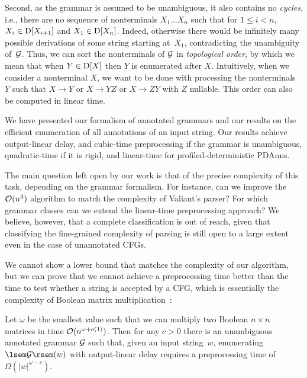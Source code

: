 Second, as the grammar is assumed to be unambiguous, it also contains
no \emph{cycles}, %
i.e., there are no sequence of nonterminals
$X_1 \dots X_n$ such that for $1\leq i < n$, $X_i\in \mathrm{D}[X_{i+1}]$ and
$X_1\in \mathrm{D}[X_n]$. Indeed, otherwise 
%
there would be infinitely many possible derivations of some string
starting at~$X_1$, contradicting the unambiguity of~$\mathcal{G}$.  Thus, we can sort the nonterminals of $\mathcal{G}$
in \emph{topological order}, by which we mean that when $Y\in \mathrm{D}[X]$
then $Y$ is enumerated after $X$. Intuitively, when we consider a nonterminal
$X$, we want to be done with processing the nonterminals $Y$ such that $X \rightarrow
Y$ or $X \rightarrow YZ$ or $X \rightarrow ZY$ with $Z$ nullable. This order can also be computed in linear time.
%


%
%

We have presented our formalism of annotated grammars and our results on the
efficient enumeration of all annotations of an input string. Our results achieve
output-linear delay, and cubic-time preprocessing if the grammar is unambiguous,
quadratic-time if it is rigid, and linear-time for profiled-deterministic PDAnns.

The main question left open by our work is that of the precise complexity of
this task, depending on the grammar formalism. For instance, can we improve the 
$\mathcal{O}(n^3)$ algorithm to match the complexity of Valiant's parser? For which grammar
classes can we extend the linear-time preprocessing approach? We believe,
however, that a complete classification is out of reach, given that classifying
the fine-grained complexity of parsing is still open to a large extent even in
the case of unannotated CFGs.

%
%
We cannot show a lower bound that matches the complexity of our algorithm, but
we can prove that we cannot achieve a preprocessing time better than the time to
test whether a string is accepted by a CFG, which is essentially
the complexity of Boolean matrix multiplication~\cite{AbboudBW18}:
%
%

\begin{proposition}
  \label{prp:cubiclowerbound}
  Let $\omega$ be the
  smallest value
  such that we can multiply two Boolean $n\times
  n$ matrices in time $\mathcal{O}(n^{\omega+o(1)})$. Then for any $c>0$ there is an unambiguous
  annotated grammar $\mathcal{G}$ such that, given an input string~$w$, enumerating 
  $\sem{\cG}(w)$ with output-linear delay requires a preprocessing time of
  $\Omega(|w|^{\omega-c})$.
\end{proposition}

